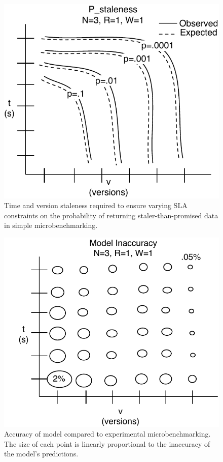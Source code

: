 \documentclass{vldb}
\begin{document}
\begin{figure}
\centering
\includegraphics[width=.8\columnwidth]{figs/bothdimensions.pdf}
\caption{Time and version staleness required to ensure varying SLA constraints on the probability of returning staler-than-promised data in simple microbenchmarking.}
\label{fig:prob-staler}
\end{figure}

\begin{figure}
\centering
\includegraphics[width=.8\columnwidth]{figs/inaccuracy.pdf}
\caption{Accuracy of model compared to experimental microbenchmarking.
  The size of each point is linearly proportional to the inaccuracy of
  the model's predictions.}
\label{fig:prob-staler}
\end{figure}
\end{document}
